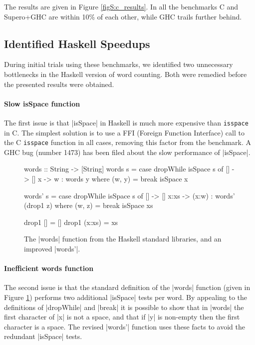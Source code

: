 The results are given in Figure \ref{figS:c_results}. In all the benchmarks C and Supero+GHC are within 10\% of each other, while GHC trails further behind.

\subsection{Identified Haskell Speedups}

During initial trials using these benchmarks, we identified two unnecessary bottlenecks in the Haskell version of word counting. Both were remedied before the presented results were obtained.

\paragraph{Slow \textsf{isSpace} function}

The first issue is that |isSpace| in Haskell is much more expensive than \texttt{isspace} in C. The simplest solution is to use a FFI (Foreign Function Interface) \cite{spj:awkward_squad} call to the C \texttt{isspace} function in all cases, removing this factor from the benchmark. A GHC bug (number 1473) has been filed about the slow performance of |isSpace|.

\begin{figure}
\begin{code}
words :: String -> [String]
words s = case  dropWhile isSpace s of
                []  ->  []
                x   ->  w : words y
                        where (w, y) = break isSpace x

words' s = case  dropWhile isSpace s of
                 []    ->  []
                 x:xs  ->  (x:w) : words' (drop1 z)
                           where (w, z) = break isSpace xs

drop1 []      = []
drop1 (x:xs)  = xs
\end{code}
\caption{The |words| function from the Haskell standard libraries, and an improved |words'|.}
\label{figS:words}
\end{figure}

\paragraph{Inefficient \textsf{words} function}

The second issue is that the standard definition of the |words| function (given in Figure \ref{figS:words}) performs two additional |isSpace| tests per word. By appealing to the definitions of |dropWhile| and |break| it is possible to show that in |words| the first character of |x| is not a space, and that if |y| is non-empty then the first character is a space. The revised |words'| function uses these facts to avoid the redundant |isSpace| tests.

